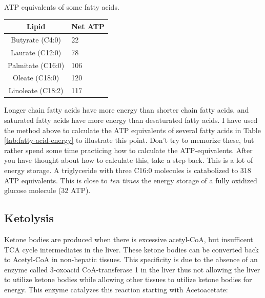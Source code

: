 \documentclass{tufte-handout}
\begin{document}
\begin{margintable}
\centering
\caption{ATP equivalents of some fatty acids.}
\label{tab:fatty-acid-energy}
\begin{tabular}{@{}cl@{}}
\toprule
\textbf{Lipid} & \textbf{Net ATP} \\ \midrule
Butyrate (C4:0)           &  22                \\
Laurate (C12:0)          & 78                    \\
Palmitate (C16:0)          & 106               \\
Oleate (C18:0)          & 120              \\
Linoleate (C18:2)          & 117            \\ \bottomrule
\end{tabular}
\end{margintable}

  Longer chain fatty acids have more energy than shorter chain fatty acids, and saturated fatty acids have more energy than desaturated fatty acids.  I have used the method above to calculate the ATP equivalents of several fatty acids in Table \ref{tab:fatty-acid-energy} to illustrate this point.  Don't try to memorize these, but rather spend some time practicing how to calculate the ATP-equivalents.  After you have thought about how to calculate this, take a step back.  This is a lot of energy storage.  A triglyceride with three C16:0 molecules is catabolized to 318 ATP equivalents.  This is close to \emph{ten times} the energy storage of a fully oxidized glucose molecule (32 ATP).

\subsection{Ketolysis}

Ketone bodies are produced when there is excessive acetyl-CoA, but insufficent TCA cycle intermediates in the liver.  These ketone bodies can be converted back to Acetyl-CoA in non-hepatic tissues.  This specificity is due to the absence of an enzyme called 3-oxoacid CoA-transferase 1 in the liver thus not allowing the liver to utilize ketone bodies while allowing other tissues to utilize ketone bodies for energy.  This enzyme catalyzes this reaction starting with Acetoacetate:
\end{document}
